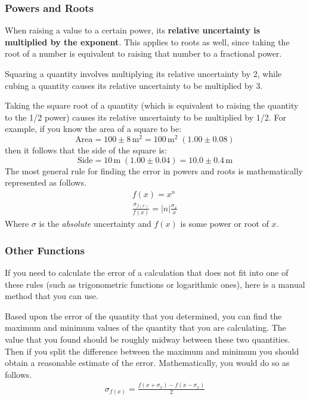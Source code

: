 \subsubsection{Powers and Roots}

When raising a value to a certain power, its \textbf{relative uncertainty is multiplied by the exponent}. This applies to roots as well, since taking the root of a number is equivalent to raising that number to a fractional power.\myskip

Squaring a quantity involves multiplying its relative uncertainty by 2, while cubing a quantity causes its relative uncertainty to be multiplied by 3.\myskip

Taking the square root of a quantity (which is equivalent to raising the quantity to the 1/2 power) causes its relative uncertainty to be multiplied by 1/2. For example, if you know the area of a square to be:
\begin{equation}
    \text{Area} = 100\pm 8\,\mathrm{m^2} = 100\,\mathrm{m}^2\;(1.00\pm 0.08)
\end{equation}
then it follows that the side of the square is:
\begin{equation}
    \text{Side} = 10\,\mathrm{m}\;\left( 1.00\pm 0.04 \right) = 10.0\pm 0.4\,\mathrm{m}
\end{equation}
The most general rule for finding the error in powers and roots is mathematically represented as follows.
\begin{gather}
f(x) = x^n \\
\frac{\sigma_{f(x)}}{f(x)} = |n| \frac{\sigma_x}{x}
\end{gather}
Where $\sigma$ is the {\it{absolute}} uncertainty and $f(x)$ is some power or root of $x$.

\subsubsection{Other Functions}

If you need to calculate the error of a calculation that does not fit into one of these rules (such as trigonometric functions or logarithmic ones), here is a manual method that you can use.\myskip

Based upon the error of the quantity that you determined, you can find the maximum and minimum values of the quantity that you are calculating. The value that you found should be roughly midway between these two quantities. Then if you split the difference between the maximum and minimum you should obtain a reasonable estimate of the error. Mathematically, you would do so as follows.
\begin{gather}
\sigma_{f(x)} = \frac{f(x + \sigma_x) - f(x - \sigma_x)}{2}
\end{gather}

